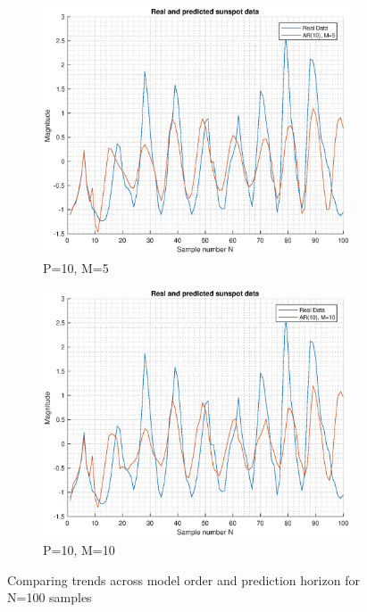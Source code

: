 \documentclass{article}
\begin{document}
\begin{figure}[h!]
\begin{subfigure}{0.24\textwidth}
\includegraphics[width = \textwidth]{ar_mod10_hor5}
\caption{P=10, M=5}
\label{fig:ar_mod10_hor5}
\end{subfigure}
\begin{subfigure}{0.24\textwidth}
\centering
\includegraphics[width = \textwidth]{ar_mod10_hor10}
\caption{P=10, M=10}
\label{fig:ar_mod10_hor10}
\end{subfigure}
\caption{Comparing trends across model order and prediction horizon for N=100 samples}
\label{fig:ar_mod_hor}
\end{figure}
\end{document}

